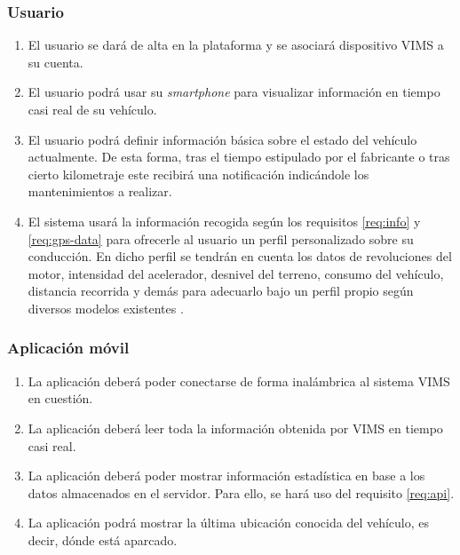 \subsubsection{Usuario}
\begin{enumerate}[resume, label=\textbf{\texttt{RF-\arabic*}}]
  \item\label{req:register} El usuario se dará de alta en la plataforma y se
        asociará dispositivo \ac{VIMS} a su cuenta.
  \item\label{req:rt} El usuario podrá usar su \textit{smartphone} para visualizar
        información en tiempo casi real de su vehículo.
  \item\label{req:maintenance} El usuario podrá definir información básica 
        sobre el estado del vehículo actualmente. De esta forma, tras el tiempo
        estipulado por el fabricante o tras cierto kilometraje este recibirá una
        notificación indicándole los mantenimientos a realizar.
  \item\label{req:driving} El sistema usará la información recogida según los
        requisitos \ref{req:info} y \ref{req:gps-data} para ofrecerle al usuario
        un perfil personalizado sobre su conducción. En dicho perfil se tendrán
        en cuenta los datos de revoluciones del motor, intensidad del acelerador,
        desnivel del terreno, consumo del vehículo, distancia recorrida y demás
        para adecuarlo bajo un perfil propio según diversos modelos existentes \cite{husseinaliameenDrivingBehaviourIdentification2021}.
\end{enumerate}

\subsubsection{Aplicación móvil}
\begin{enumerate}[resume, label=\textbf{\texttt{RF-\arabic*}}]
  \item\label{req:app-functions} La aplicación deberá poder conectarse de forma
        inalámbrica al sistema \ac{VIMS} en cuestión.
  \item\label{req:app-sampling} La aplicación deberá leer toda la información
        obtenida por \ac{VIMS} en tiempo casi real.
  \item\label{req:app-stats} La aplicación deberá poder mostrar información
        estadística en base a los datos almacenados en el servidor. Para ello,
        se hará uso del requisito \ref{req:api}.
  \item\label{req:location} La aplicación podrá mostrar la última ubicación
        conocida del vehículo, es decir, dónde está aparcado.
\end{enumerate}